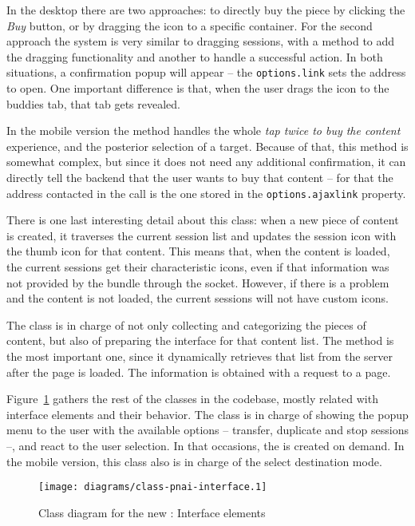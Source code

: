 In the desktop there are two approaches: to directly buy the piece by clicking the \emph{Buy} button, or by dragging the icon to a specific container.
For the second approach the system is very similar to dragging sessions, with a method to add the dragging functionality and another to handle a successful action.
In both situations, a confirmation popup will appear -- the \texttt{options.link} sets the address to open.
One important difference is that, when the user drags the icon to the buddies tab, that tab gets revealed.

In the mobile version the  method handles the whole \emph{tap twice to buy the content} experience, and the posterior selection of a target.
Because of that, this method is somewhat complex, but since it does not need any additional confirmation, it can directly tell the backend that the user wants to buy that content -- for that the address contacted in the  call is the one stored in the \texttt{options.ajaxlink} property.

There is one last interesting detail about this class: when a new piece of content is created, it traverses the current session list and updates the session icon with the thumb icon for that content.
This means that, when the content is loaded, the current sessions get their characteristic icons, even if that information was not provided by the  bundle through the socket.
However, if there is a problem and the content is not loaded, the current sessions will not have custom icons.

The  class is in charge of not only collecting and categorizing the pieces of content, but also of preparing the interface for that content list.
The  method is the most important one, since it dynamically retrieves that list from the server after the page is loaded.
The information is obtained with a  request to a  page.

Figure~\ref{fig:class-pnai-interface} gathers the rest of the classes in the  codebase, mostly related with interface elements and their behavior.
The  class is in charge of showing the popup menu to the user with the available options -- transfer, duplicate and stop sessions --, and react to the user selection.
In that occasions, the  is created on demand.
In the mobile version, this class also is in charge of the select destination mode.

\begin{figure}[htbp]
  \centering
    \texttt{[image: diagrams/class-pnai-interface.1]}
  \caption{Class diagram for the new : Interface elements}
  \label{fig:class-pnai-interface}
\end{figure}

